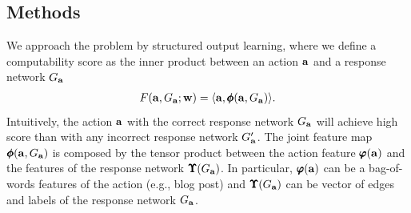 {%
\subsection{Methods}
We approach the problem by structured output learning, where we define a computability score as the inner product between an action $\mathbf {a}$ and a response network $G_{\mathbf {a}}$
\begin{align*}
	F(\mathbf {a},G_{\mathbf {a}};\mathbf {w}) = \langle \mathbf {a}, \pmb \phi(\mathbf {a},G_{\mathbf {a}}) \rangle.
\end{align*}
Intuitively, the action $\mathbf {a}$ with the correct response network $G_{\mathbf {a}}$ will achieve high score than with any incorrect response network $G_{\mathbf {a}}'$.
The joint feature map $\pmb \phi(\mathbf {a},G_{\mathbf {a}})$ is composed by the tensor product between the action feature $\pmb \varphi(\mathbf {a})$ and the features of the response network $\pmb \Upsilon(G_{\mathbf {a}})$.
In particular, $\pmb \varphi(\mathbf {a})$ can be a bag-of-words features of the action (e.g., blog post) and $\pmb \Upsilon(G_{\mathbf {a}})$ can be vector of edges and labels of the response network $G_{\mathbf {a}}$.

}

